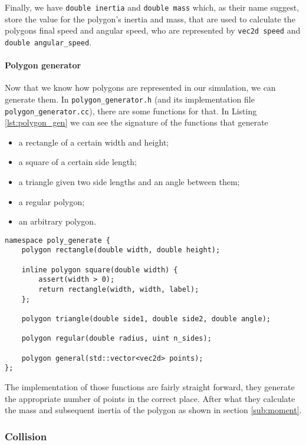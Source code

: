 Finally, we have \lstinline{double inertia} and \lstinline{double mass} which,
as their name suggest, store the value for the polygon's inertia and mass, that
are used to calculate the polygons final speed and angular speed, who are
represented by \lstinline{vec2d speed} and \lstinline{double angular_speed}.

\paragraph{Polygon generator} Now that we know how polygons are represented in
our simulation, we can generate them. In \texttt{polygon\_generator.h} (and its
implementation file \texttt{polygon\_generator.cc}), there are some functions
for that. In Listing \ref{lst:polygon_gen} we can see the signature of the
functions that generate
\begin{itemize}
	\item a rectangle of a certain width and height;
	\item a square of a certain side length;
	\item a triangle given two side lengths and an angle between them;
	\item a regular polygon;
	\item an arbitrary polygon.
\end{itemize}

\begin{lstlisting}[caption={Polygon Generator header
file},label={lst:polygon_gen}]
namespace poly_generate {
    polygon rectangle(double width, double height);

    inline polygon square(double width) {
        assert(width > 0);
        return rectangle(width, width, label);
    };

    polygon triangle(double side1, double side2, double angle);

    polygon regular(double radius, uint n_sides);

    polygon general(std::vector<vec2d> points);
};
\end{lstlisting}

The implementation of those functions are fairly straight forward, they generate
the appropriate number of points in the correct place. After what they calculate
the mass and subsequent inertia of the polygon as shown in section
\ref{sub:moment}.

\subsubsection{Collision}
\label{sub:implementation-collision-detection}

